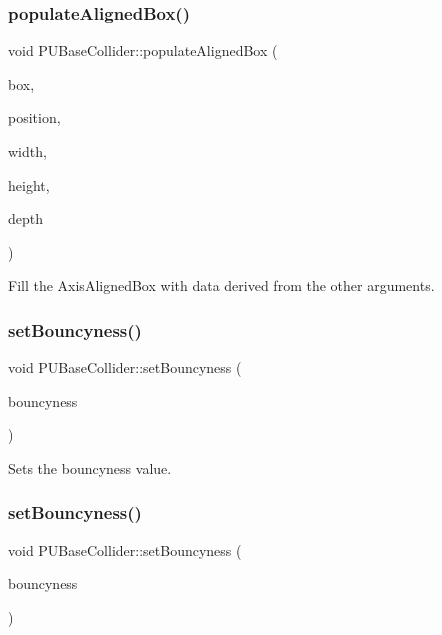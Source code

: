 \subsubsection{\texorpdfstring{populate\+Aligned\+Box()}{populateAlignedBox()}\hspace{0.1cm}{\footnotesize\ttfamily [2/2]}}
{\footnotesize\ttfamily void P\+U\+Base\+Collider\+::populate\+Aligned\+Box (\begin{DoxyParamCaption}\item[{\hyperlink{classAABB}{A\+A\+BB} \&}]{box,  }\item[{const \hyperlink{classVec3}{Vec3} \&}]{position,  }\item[{const float}]{width,  }\item[{const float}]{height,  }\item[{const float}]{depth }\end{DoxyParamCaption})}

Fill the Axis\+Aligned\+Box with data derived from the other arguments. \mbox{\label{classPUBaseCollider_a28690e04c5a9733a302f804f64a20520}} 
\subsubsection{\texorpdfstring{set\+Bouncyness()}{setBouncyness()}\hspace{0.1cm}{\footnotesize\ttfamily [1/2]}}
{\footnotesize\ttfamily void P\+U\+Base\+Collider\+::set\+Bouncyness (\begin{DoxyParamCaption}\item[{const float}]{bouncyness }\end{DoxyParamCaption})}

Sets the bouncyness value. \mbox{\label{classPUBaseCollider_a28690e04c5a9733a302f804f64a20520}} 
\subsubsection{\texorpdfstring{set\+Bouncyness()}{setBouncyness()}\hspace{0.1cm}{\footnotesize\ttfamily [2/2]}}
{\footnotesize\ttfamily void P\+U\+Base\+Collider\+::set\+Bouncyness (\begin{DoxyParamCaption}\item[{const float}]{bouncyness }\end{DoxyParamCaption})}

